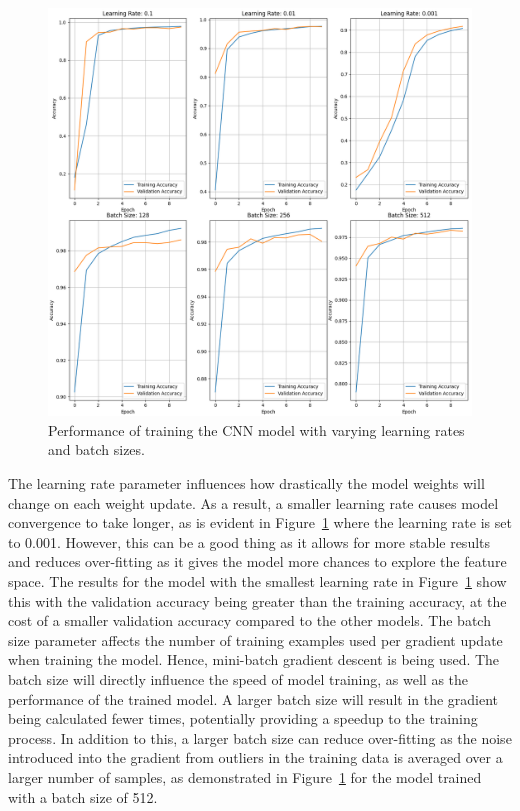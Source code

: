 \documentclass[a4paper]{article}
\begin{document}
\begin{figure}[h]
    \centering
    \includegraphics[scale=0.4]{images/learning-rate-batch-size-cnn.png}
    \caption{Performance of training the CNN model with varying learning rates and batch sizes.}
    \label{fig:training-params}
\end{figure}

The learning rate parameter influences how drastically the model weights will change on each weight update. As a result, a smaller learning rate causes model convergence to take longer, as is evident in Figure~\ref{fig:training-params} where the learning rate is set to 0.001. However, this can be a good thing as it allows for more stable results and reduces over-fitting as it gives the model more chances to explore the feature space. The results for the model with the smallest learning rate in Figure~\ref{fig:training-params} show this with the validation accuracy being greater than the training accuracy, at the cost of a smaller validation accuracy compared to the other models. The batch size parameter affects the number of training examples used per gradient update when training the model. Hence, mini-batch gradient descent is being used. The batch size will directly influence the speed of model training, as well as the performance of the trained model. A larger batch size will result in the gradient being calculated fewer times, potentially providing a speedup to the training process. In addition to this, a larger batch size can reduce over-fitting as the noise introduced into the gradient from outliers in the training data is averaged over a larger number of samples, as demonstrated in Figure~\ref{fig:training-params} for the model trained with a batch size of 512.
\end{document}

